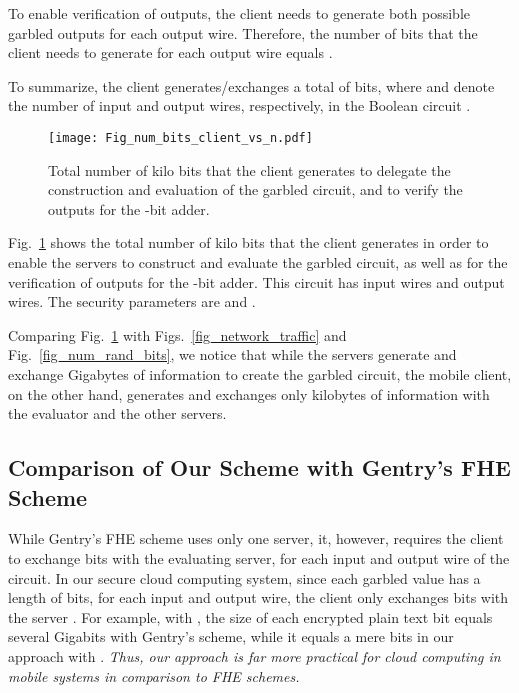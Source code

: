 \documentclass[10pt,journal,cspaper,compsoc]{IEEEtran}
\begin{document}
To enable verification of outputs, the client needs to generate both possible garbled outputs for each output wire. Therefore, the number of bits that the client needs to generate for each output wire equals .


To summarize, the client generates/exchanges a total of  bits, where  and  denote the number of input and output wires, respectively, in the Boolean circuit .

\begin{figure}[t]
\centering
\texttt{[image: Fig\_num\_bits\_client\_vs\_n.pdf]}
\vspace{-3 mm}
\caption{Total number of kilo bits that the client generates to delegate the construction and evaluation of the garbled circuit, and to verify the outputs for the -bit adder.\vspace{-3 mm}}
\label{fig_num_bits_client}
\end{figure}


Fig.~\ref{fig_num_bits_client} shows the total number of kilo bits that the client generates in order to enable the servers to construct and evaluate the garbled circuit, as well as for the verification of outputs for the -bit adder. This circuit has  input wires and  output wires. The security parameters are  and .


Comparing Fig.~\ref{fig_num_bits_client} with Figs.~\ref{fig_network_traffic} and Fig.~\ref{fig_num_rand_bits}, we notice that while the servers generate and exchange Gigabytes of information to create the garbled circuit, the mobile client, on the other hand, generates and exchanges only kilobytes of information with the evaluator and the other servers.


\subsection{Comparison of Our Scheme with Gentry's FHE Scheme}
While Gentry's FHE scheme \cite{gentry10} uses only one server, it, however, requires the client to exchange  bits with the evaluating server, for each input and output wire of the circuit. In our secure cloud computing system, since each garbled value has a length of  bits, for each input and output wire, the client only exchanges  bits with the server . For example, with , the size of each encrypted plain text bit equals several Gigabits with Gentry's scheme, while it equals a mere  bits in our approach with . {\em Thus, our approach is far more practical for cloud computing in mobile systems in comparison to FHE schemes.}
\end{document}
